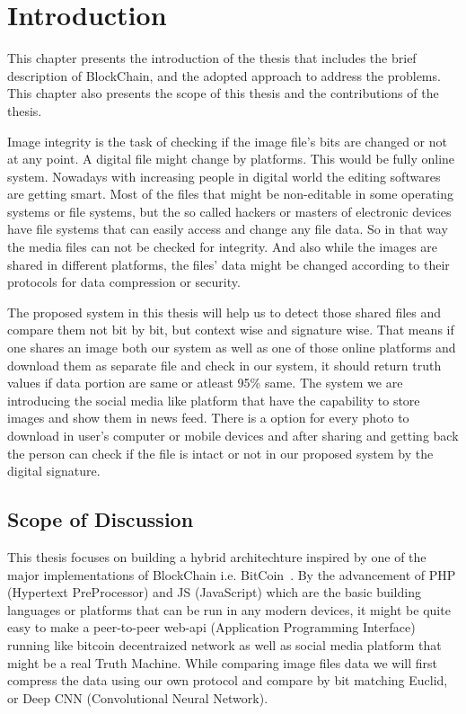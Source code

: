 \chapter{Introduction}
\label{Ch1}

\bigskip
\bigskip
\bigskip

This chapter presents the introduction of the thesis that includes the brief description of BlockChain, and the adopted approach to address the problems. This chapter also presents the scope of this thesis and the contributions of the thesis.

Image integrity is the task of checking if the image file's bits are changed or not at any point. A digital file might change by platforms. This would be fully online system. Nowadays with increasing people in digital world the editing softwares are getting smart. Most of the files that might be non-editable in some operating systems or file systems, but the so called hackers or masters of electronic devices have file systems that can easily access and change any file data. So in that way the media files can not be checked for integrity. And also while the images are shared in different platforms, the files' data might be changed according to their protocols for data compression or security.

The proposed system in this thesis will help us to detect those shared files and compare them not bit by bit, but context wise and signature wise. That means if one shares an image both our system as well as one of those online platforms and download them as separate file and check in our system, it should return truth values if data portion are same or atleast 95\% same. The system we are introducing the social media like platform that have the capability to store images and show them in news feed. There is a option for every photo to download in user's computer or mobile devices and after sharing and getting back the person can check if the file is intact or not in our proposed system by the digital signature.

\section{Scope of Discussion}
This thesis focuses on building a hybrid architechture inspired by one of the major implementations of BlockChain i.e. BitCoin~\cite{nakamoto2008bitcoin}. By the advancement of PHP (Hypertext PreProcessor) and JS (JavaScript) which are the basic building languages or platforms that can be run in any modern devices, it might be quite easy to make a peer-to-peer web-api (Application Programming Interface) running like bitcoin decentraized network as well as social media platform that might be a real Truth Machine. While comparing image files data we will first compress the data using our own protocol and compare by bit matching Euclid, or Deep CNN (Convolutional Neural Network).

